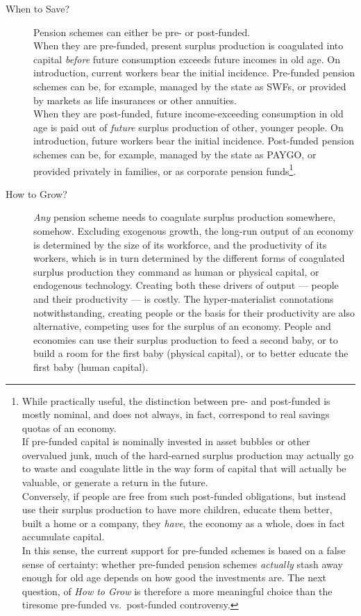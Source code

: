 \begin{description}
	\item[When to Save?] Pension schemes can either be pre- or post-funded. \\
	When they are pre-funded, present surplus production is coagulated into capital \emph{before} future consumption exceeds future incomes in old age. On introduction, current workers bear the initial incidence. Pre-funded pension schemes can be, for example, managed by the state as \glspl{SWF}, or provided by markets as life insurances or other annuities.\\
	When they are post-funded, future income-exceeding consumption in old age is paid out of \emph{future} surplus production of other, younger people. On introduction, future workers bear the initial incidence. Post-funded pension schemes can be, for example, managed by the state as PAYGO, or provided privately in families, or as corporate pension funds\footnote{
		While practically useful, the distinction between pre- and post-funded is mostly nominal, and does not always, in fact, correspond to real savings quotas of an economy. \\
		If pre-funded capital is nominally invested in asset bubbles or other overvalued junk, much of the hard-earned surplus production may actually go to waste and coagulate little in the way form of capital that will actually be valuable, or generate a return in the future. \\
		Conversely, if people are free from such post-funded obligations, but instead use their surplus production to have more children, educate them better, built a home or a company, they \emph{have}, the economy as a whole, does in fact accumulate capital. \\
		In this sense, the current support for pre-funded schemes is based on a false sense of certainty: whether pre-funded pension schemes \emph{actually} stash away enough for old age depends on how good the investments are. The next question, of \emph{How to Grow} is therefore a more meaningful choice than the tiresome pre-funded vs.\ post-funded controversy.}.\\
	\item[How to Grow?] \emph{Any} pension scheme needs to coagulate surplus production somewhere, somehow. Excluding exogenous growth, the long-run output of an economy is determined by the size of its workforce, and the productivity of its workers, which is in turn determined by the different forms of coagulated surplus production they command as human or physical capital, or endogenous technology. Creating both these drivers of output --- people and their productivity --- is costly. The hyper-materialist connotations notwithstanding, creating people or the basis for their productivity are also alternative, competing uses for the surplus of an economy. People and economies can use their surplus production to feed a second baby, or to build a room for the first baby (physical capital), or to better educate the first baby (human capital). \\

\end{description}
